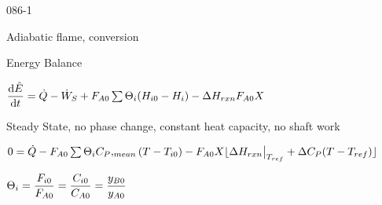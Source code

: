 \begin{mitframe}{086-1}
	

\begin{listone}

	\item Adiabatic flame, conversion
    \item Energy Balance

	\begin{listtwo}
		\item $\dfrac{\mathrm{d}\hat{\energy}}{\mathrm{d}\timet}=\dot{\heatflow}-{\dot{\work}}_{\entropy}+\force_{\helmholtz\init}\sum\nolimits\dimltemp_{\state}(\enthalpy_{\state{\init}}-\enthalpy_{\state})-\iipf\enthalpy_{rxn}\force_{\helmholtz\init}X$
		
        \item Steady State, no phase change, constant heat capacity, no shaft work
		
        \begin{listthree}
			\item $0=\dot{\heatflow}-\force_{\helmholtz\init}\sum\nolimits\dimltemp_{\state}\cp,_{mean}(\Temp-\Temp_{\state\init})-\force_{\helmholtz\init}X\lfloor\iipf\enthalpy_{rxn}\big|_{\Temp_{ref}}+\iipf\cp(\Temp-\Temp_{ref})\rfloor$
			\item $\dimltemp_{\state}=\dfrac{\force_{\state\init}}{\force_{\helmholtz\init}}=\dfrac{\conc_{\state\init}}{\conc_{\helmholtz\init}}=\dfrac{y_{\exergy\init}}{y_{\helmholtz\init}}$
	    \end{listthree}
                
    \end{listtwo}

\end{listone}

\end{mitframe}